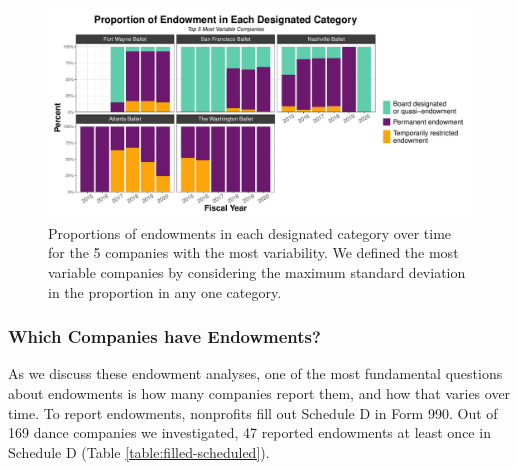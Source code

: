 \documentclass[Dance Data
Project,article,submit,moreauthors,pdftex]{mdpi}
\begin{document}
\begin{figure}[H]
\includegraphics[width=0.9\linewidth,]{../images/prop_endowment_type_most_variable} \caption{\label{fig:prop-most-variable} Proportions of endowments in each designated category over time for the 5 companies with the most variability. We defined the most variable companies by considering the maximum standard deviation in the proportion in any one category.}\label{fig:proportion-endowment-categories-most-variable}
\end{figure}

\hypertarget{which-companies-have-endowments}{%
\subsubsection{Which Companies have
Endowments?}\label{which-companies-have-endowments}}

As we discuss these endowment analyses, one of the most fundamental
questions about endowments is how many companies report them, and how
that varies over time. To report endowments, nonprofits fill out
Schedule D in Form 990. Out of 169 dance companies we investigated, 47
reported endowments at least once in Schedule D (Table
\ref{table:filled-scheduled}).
\end{document}
